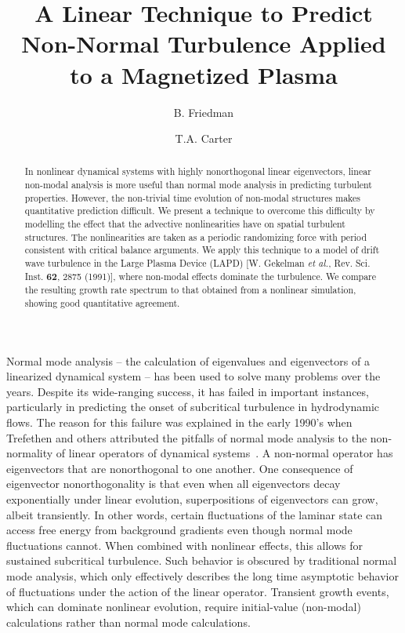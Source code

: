 \documentclass[letter,scriptaddress,twocolumn, prl,showkeys]{revtex4}
\begin{document}
\title{A Linear Technique to Predict Non-Normal Turbulence Applied to a Magnetized Plasma}

\author{B. Friedman}

\author{T.A. Carter}




\begin{abstract}
In nonlinear dynamical systems with highly nonorthogonal linear eigenvectors, linear non-modal analysis is more useful than normal mode analysis in predicting turbulent properties. 
However, the non-trivial time evolution of non-modal structures makes quantitative prediction difficult. We present a technique to overcome this difficulty by modelling the effect that the advective nonlinearities have on spatial turbulent structures. The nonlinearities are taken as a periodic randomizing force with
period consistent with critical balance arguments. We apply this technique to a model of drift wave turbulence in the Large Plasma Device (LAPD) 
[W. Gekelman \emph{et al.}, Rev. Sci. Inst. {\bf 62}, 2875 (1991)], where non-modal effects dominate the turbulence.
We compare the resulting growth rate spectrum to that obtained from a nonlinear simulation, showing good quantitative agreement.
\end{abstract}

\maketitle

Normal mode analysis -- the calculation of eigenvalues and eigenvectors of a linearized dynamical system -- has been used to solve many problems over the years.
Despite its wide-ranging success, it has failed in important instances, particularly in predicting the onset of subcritical turbulence in hydrodynamic flows. 
The reason for this failure was explained in the early 1990's when Trefethen and others attributed the pitfalls of normal mode analysis to the non-normality of linear operators of
dynamical systems~\cite{trefethen1993,schmid2007}. A non-normal operator has 
eigenvectors that are nonorthogonal to one another. One consequence of eigenvector nonorthogonality is that even when all eigenvectors decay exponentially under linear evolution, 
superpositions of eigenvectors can grow, albeit transiently.
In other words, certain fluctuations of the laminar state can access free energy from background gradients even though normal mode fluctuations cannot.
When combined with nonlinear effects, this allows for sustained subcritical turbulence.
Such behavior is obscured by traditional normal mode analysis, which only effectively describes the long time asymptotic behavior of fluctuations under the 
action of the linear operator. Transient growth events, which can dominate nonlinear evolution, require initial-value (non-modal) calculations rather than normal mode calculations.
\end{document}
